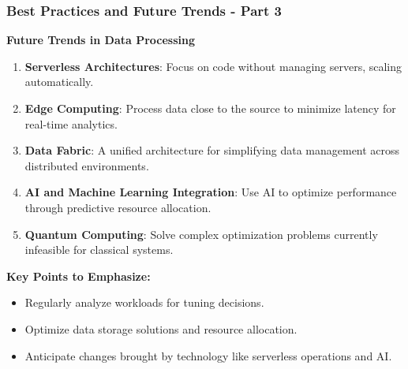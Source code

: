 \documentclass{beamer}
\begin{document}
\begin{frame}[fragile]
    \frametitle{Best Practices and Future Trends - Part 3}
    \textbf{Future Trends in Data Processing}

    \begin{enumerate}
        \item \textbf{Serverless Architectures}: Focus on code without managing servers, scaling automatically.
        \item \textbf{Edge Computing}: Process data close to the source to minimize latency for real-time analytics.
        \item \textbf{Data Fabric}: A unified architecture for simplifying data management across distributed environments.
        \item \textbf{AI and Machine Learning Integration}: Use AI to optimize performance through predictive resource allocation.
        \item \textbf{Quantum Computing}: Solve complex optimization problems currently infeasible for classical systems.
    \end{enumerate}

    \textbf{Key Points to Emphasize:}
    \begin{itemize}
        \item Regularly analyze workloads for tuning decisions.
        \item Optimize data storage solutions and resource allocation.
        \item Anticipate changes brought by technology like serverless operations and AI.
    \end{itemize}
\end{frame}
\end{document}
